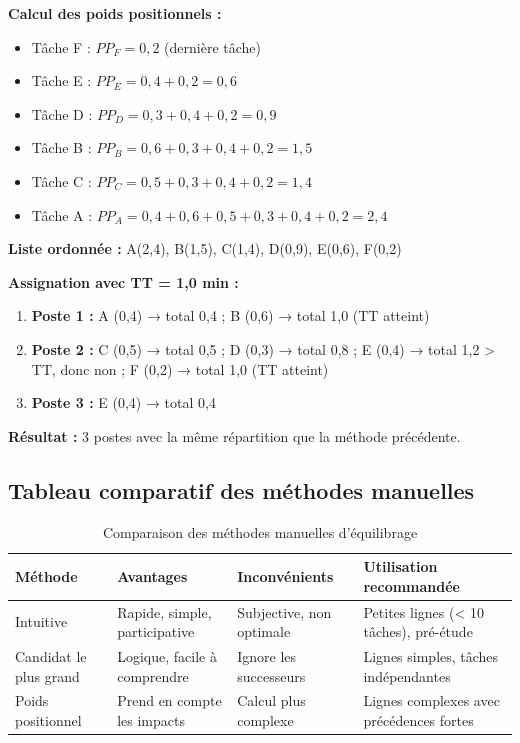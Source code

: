 \documentclass[12pt,a4paper]{article}
\begin{document}
\textbf{Calcul des poids positionnels :}

\begin{itemize}
    \item Tâche F : $PP_F = 0,2$ (dernière tâche)
    \item Tâche E : $PP_E = 0,4 + 0,2 = 0,6$
    \item Tâche D : $PP_D = 0,3 + 0,4 + 0,2 = 0,9$
    \item Tâche B : $PP_B = 0,6 + 0,3 + 0,4 + 0,2 = 1,5$
    \item Tâche C : $PP_C = 0,5 + 0,3 + 0,4 + 0,2 = 1,4$
    \item Tâche A : $PP_A = 0,4 + 0,6 + 0,5 + 0,3 + 0,4 + 0,2 = 2,4$
\end{itemize}

\textbf{Liste ordonnée :} A(2,4), B(1,5), C(1,4), D(0,9), E(0,6), F(0,2)

\textbf{Assignation avec TT = 1,0 min :}

\begin{enumerate}
    \item \textbf{Poste 1 :} A (0,4) → total 0,4 ; B (0,6) → total 1,0 (TT atteint)
    \item \textbf{Poste 2 :} C (0,5) → total 0,5 ; D (0,3) → total 0,8 ; E (0,4) → total 1,2 > TT, donc non ; F (0,2) → total 1,0 (TT atteint)
    \item \textbf{Poste 3 :} E (0,4) → total 0,4
\end{enumerate}

\textbf{Résultat :} 3 postes avec la même répartition que la méthode précédente.

\subsection{Tableau comparatif des méthodes manuelles}

\begin{table}[H]
\centering
\begin{tabular}{|p{3cm}|p{3cm}|p{3cm}|p{4cm}|}
\hline
\textbf{Méthode} & \textbf{Avantages} & \textbf{Inconvénients} & \textbf{Utilisation recommandée} \\
\hline
Intuitive & Rapide, simple, participative & Subjective, non optimale & Petites lignes (< 10 tâches), pré-étude \\
\hline
Candidat le plus grand & Logique, facile à comprendre & Ignore les successeurs & Lignes simples, tâches indépendantes \\
\hline
Poids positionnel & Prend en compte les impacts & Calcul plus complexe & Lignes complexes avec précédences fortes \\
\hline
\end{tabular}
\caption{Comparaison des méthodes manuelles d'équilibrage}
\end{table}
\end{document}
